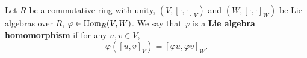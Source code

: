 \begin{definition}
  Let
    $R$ be a commutative ring with unity,
    $(V, [\cdot, \cdot]_V)$ and
    $(W, [\cdot, \cdot]_W)$ be Lie algebras over $R$,
    $\varphi \in \mathop{\rm Hom}\nolimits_R(V, W)$.
  We say that $\varphi$ is a \textbf{Lie algebra homomorphism}
  if for any $u, v \in V$,
  \begin{equation}
    \varphi([u, v]_V) = [\varphi u, \varphi v]_W.
  \end{equation}
\end{definition}
